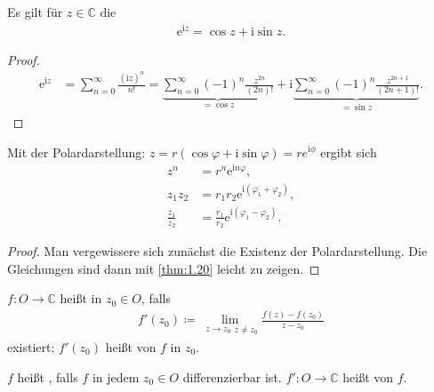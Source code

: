 \begin{notice}[Folgerung] \label{thm:1.22}
  \begin{enum-arab}
    \item Es gilt für $z \in \mathbb{C}$ die 
      \begin{align*}
        \mathrm{e}^{\mathrm{i} z} = \cos z + \mathrm{i} \sin z.
      \end{align*}
      \begin{proof}
        \begin{align*}
          \mathrm{e}^{\mathrm{i} z}
          &= \sum\limits_{n=0}^{\infty} \frac{(\mathrm{i} z)^n}{n!}
          = \underbrace{\sum\limits_{n=0}^{\infty} (-1)^{n} \frac{z^{2n}}{(2n)!}}_{=\cos z} + \mathrm{i} \underbrace{\sum\limits_{n=0}^{\infty} (-1)^{n} \frac{z^{2n+1}}{(2n+1)!}}_{=\sin z}.
        \end{align*}
      \end{proof}
    
    \item Mit der Polardarstellung: $z = r (\cos \varphi + \mathrm{i} \sin \varphi) = r e^{\mathrm{i}\phi}$ ergibt sich
    \begin{align*}
      z^n &= r^n \mathrm{e}^{\mathrm{i} n \varphi}, \\
      z_1 z_2 &= r_1 r_2 \mathrm{e}^{\mathrm{i} (\varphi_1 + \varphi_2)}, \\
      \frac{z_1}{z_2} &= \frac{r_1}{r_2} \mathrm{e}^{\mathrm{i} (\varphi_1 - \varphi_2)}.
    \end{align*}
    \begin{proof}
      Man vergewissere sich zunächst die Existenz der Polardarstellung.
      Die Gleichungen sind dann mit \ref{thm:1.20} leicht zu zeigen.
    \end{proof}

  \end{enum-arab}
\end{notice}

\begin{theorem}[Definition]
  \begin{enum-arab}
    \item $f : O \to \mathbb{C}$ heißt  in $z_0 \in O$, falls
    \begin{align*}
      f'(z_0) \coloneq \lim\limits_{\substack{z \to z_0}{z \neq z_0}} \frac{f(z) - f(z_0)}{z - z_0}
    \end{align*}
    existiert; $f'(z_0)$ heißt  von $f$ in $z_0$.
    
    \item $f$ heißt , falls $f$ in jedem $z_0 \in O$ differenzierbar ist. $f' : O \to \mathbb{C}$ heißt  von $f$.
  \end{enum-arab}
\end{theorem}

